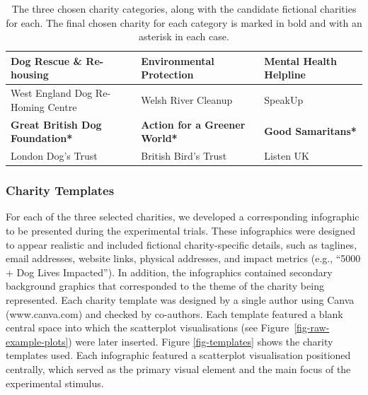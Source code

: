 \documentclass[
  authoryear,
  preprint,
  3p]{elsarticle}
\begin{document}
\begin{table}

\caption{\label{tab:unnamed-chunk-1}\label{tbl-candidate-charities}The three chosen charity categories, along with the candidate fictional charities for each. The final chosen charity for each category is marked in bold and with an asterisk in each case.}
\centering
\begin{tabular}[t]{lll}
\toprule
Dog Rescue \& Re-housing & Environmental Protection & Mental Health Helpline\\
\midrule
West England Dog Re-Homing Centre & Welsh River Cleanup & SpeakUp\\
\textbf{Great British Dog Foundation*} & \textbf{Action for a Greener World*} & \textbf{Good Samaritans*}\\
London Dog’s Trust & British Bird’s Trust & Listen UK\\
\bottomrule
\end{tabular}
\end{table}

\subsubsection{Charity Templates}\label{sec-stimuli-charity-templates}

For each of the three selected charities, we developed a corresponding
infographic to be presented during the experimental trials. These
infographics were designed to appear realistic and included fictional
charity-specific details, such as taglines, email addresses, website
links, physical addresses, and impact metrics (e.g., ``5000 + Dog Lives
Impacted''). In addition, the infographics contained secondary
background graphics that corresponded to the theme of the charity being
represented. Each charity template was designed by a single author using
Canva (www.canva.com) and checked by co-authors. Each template featured
a blank central space into which the scatterplot visualisations (see
Figure~\ref{fig-raw-example-plots}) were later inserted. Figure
\ref{fig-templates} shows the charity templates used. Each infographic
featured a scatterplot visualisation positioned centrally, which served
as the primary visual element and the main focus of the experimental
stimulus.
\end{document}

